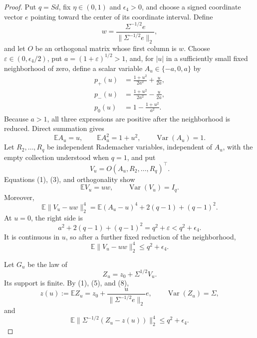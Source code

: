\documentclass{article}
\begin{document}
\begin{proof}
Put \(q=Sd\), fix \(\eta\in(0,1)\) and \(\epsilon_4>0\), and choose a signed coordinate vector \(e\) pointing toward the center of its coordinate interval.  Define
\[
 w=\frac{\Sigma^{-1/2}e}{\|\Sigma^{-1/2}e\|_2},            \tag{1}
\]
and let \(O\) be an orthogonal matrix whose first column is \(w\).  Choose
\(\varepsilon\in(0,\epsilon_4/2)\), put
\(a=(1+\varepsilon)^{1/2}>1\), and, for \(|u|\) in a sufficiently small fixed neighborhood of zero, define a scalar variable \(A_u\in\{-a,0,a\}\) by
\[
\begin{aligned}
 p_+(u)&=\frac{1+u^2}{2a^2}+\frac{u}{2a},\\
 p_-(u)&=\frac{1+u^2}{2a^2}-\frac{u}{2a},\\
 p_0(u)&=1-\frac{1+u^2}{a^2}.
\end{aligned}                                               \tag{2}
\]
Because \(a>1\), all three expressions are positive after the neighborhood is reduced.  Direct summation gives
\[
 \mathbb EA_u=u,
 \qquad \mathbb EA_u^2=1+u^2,
 \qquad \operatorname{Var}(A_u)=1.                         \tag{3}
\]
Let \(R_2,\ldots,R_q\) be independent Rademacher variables, independent of \(A_u\), with the empty collection understood when \(q=1\), and put
\[
 V_u=O(A_u,R_2,\ldots,R_q)^\top.                           \tag{4}
\]
Equations (1), (3), and orthogonality show
\[
 \mathbb EV_u=uw,
 \qquad \operatorname{Var}(V_u)=I_q.                       \tag{5}
\]
Moreover,
\[
 \mathbb E\|V_u-uw\|_2^4
 =\mathbb E(A_u-u)^4+2(q-1)+(q-1)^2.                       \tag{6}
\]
At \(u=0\), the right side is
\[
 a^2+2(q-1)+(q-1)^2=q^2+\varepsilon<q^2+\epsilon_4.        \tag{7}
\]
It is continuous in \(u\), so after a further fixed reduction of the neighborhood,
\[
 \mathbb E\|V_u-uw\|_2^4\le q^2+\epsilon_4.               \tag{8}
\]

Let \(G_u\) be the law of
\[
 Z_u=z_0+\Sigma^{1/2}V_u.                                  \tag{9}
\]
Its support is finite.  By (1), (5), and (8),
\[
 z(u):=\mathbb EZ_u
 =z_0+\frac{u}{\|\Sigma^{-1/2}e\|_2}e,
 \qquad \operatorname{Var}(Z_u)=\Sigma,                   \tag{10}
\]
and
\[
 \mathbb E\|\Sigma^{-1/2}(Z_u-z(u))\|_2^4
 \le q^2+\epsilon_4.                                      \tag{11}
\]


\end{proof}
\end{document}
